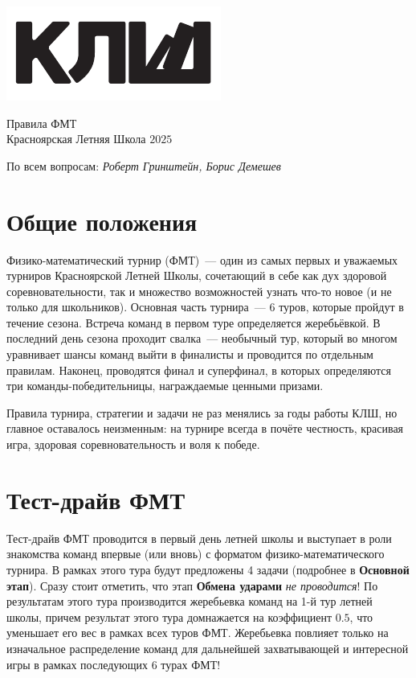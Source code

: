 \documentclass[12pt]{article}
\begin{document}
\begin{flushleft}
\parbox[t][0pt]{0.2\textwidth}
{
{%
\vspace{0\baselineskip}
\includegraphics[scale=1.5]{klsh_logo_mod.pdf}\par
}
}
\end{flushleft}
\newcommand{\klshyear}{2025}
\hfill
\parbox[t][0pt]{0.80\textwidth}
{
{\centering
\vspace{-1.5\baselineskip}
\begin{flushright}
{\Huge Правила ФМТ}\\
{Красноярская Летняя Школа $\klshyear$}\par
По всем вопросам: {\it  Роберт Гринштейн, Борис Демешев}
\end{flushright}
}
}
\vspace{4\baselineskip}

\section*{Общие положения}
Физико-математический турнир (ФМТ)~--- один из самых первых и уважаемых турниров Красноярской Летней Школы, сочетающий в себе как дух здоровой соревновательности, так и множество возможностей узнать что-то новое (и не только для школьников). Основная часть турнира~--- 6 туров, которые пройдут в течение сезона. Встреча команд в первом туре определяется жеребьёвкой. В последний день сезона проходит свалка~--- необычный тур, который во многом уравнивает шансы команд выйти в финалисты и проводится по отдельным правилам. Наконец, проводятся финал и суперфинал, в которых определяются три команды-победительницы, награждаемые ценными призами.

Правила турнира, стратегии и задачи не раз менялись за годы работы КЛШ, но главное оставалось неизменным: на турнире всегда в почёте честность, красивая игра, здоровая соревновательность и воля к победе.

\section*{Тест-драйв ФМТ}
Тест-драйв ФМТ проводится в первый день летней школы и выступает в роли знакомства команд впервые (или вновь) с форматом физико-математического турнира. В рамках этого тура будут предложены 4 задачи (подробнее в \textbf{Основной этап}). Сразу стоит отметить, что этап \textbf{Обмена ударами} \textit{не проводится}!  По результатам этого тура производится жеребьевка команд на 1-й тур летней школы, причем результат этого тура домнажается на коэффициент $0.5$, что уменьшает его вес в рамках всех туров ФМТ. Жеребьевка повлияет только на изначальное распределение команд для дальнейшей захватывающей и интересной игры в рамках последующих 6 турах ФМТ!
\end{document}
